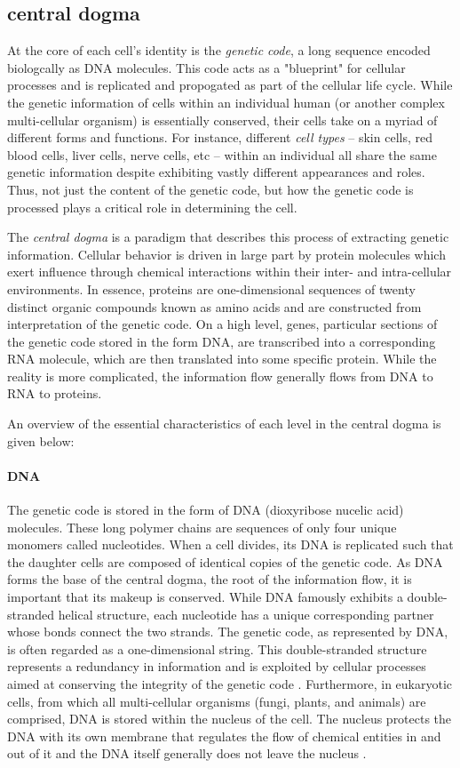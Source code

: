 \subsection{central dogma}
At the core of each cell's identity is the \emph{genetic code}, a long sequence encoded biologcally as DNA molecules.
This code acts as a "blueprint" for cellular processes and
is replicated and propogated as part of the cellular life cycle.
While the genetic information of cells within an individual human (or another complex multi-cellular organism) is essentially conserved, their cells take on a myriad of different forms and functions.
For instance, different \emph{cell types} -- skin cells, red blood cells, liver cells, nerve cells, etc -- within an individual all share the same genetic information despite exhibiting vastly different appearances and roles.
Thus, not just the content of the genetic code, but how the genetic code is processed plays a critical role in determining the cell.

The \emph{central dogma} is a paradigm that describes this process of extracting genetic information.
Cellular behavior is driven in large part by protein molecules which exert influence through chemical interactions within their inter- and intra-cellular environments.
In essence, proteins are one-dimensional sequences of twenty distinct organic compounds known as amino acids and are constructed from interpretation of the genetic code.
On a high level, genes, particular sections of the genetic code stored in the form DNA, are transcribed into a corresponding RNA molecule, which are then translated into some specific protein.
While the reality is more complicated, the information flow generally flows from DNA to RNA to proteins.

An overview of the essential characteristics of each level in the central dogma is given below:

\paragraph{DNA} The genetic code is stored in the form of DNA (dioxyribose nucelic acid) molecules.
These long polymer chains are sequences of only four unique monomers called nucleotides.
When a cell divides, its DNA is replicated such that the daughter cells are composed of identical copies of the genetic code.
As DNA forms the base of the central dogma, the root of the information flow, it is important that its makeup is conserved.
While DNA famously exhibits a double-stranded helical structure,
each nucleotide has a unique corresponding partner whose bonds connect the two strands.
The genetic code, as represented by DNA, is often regarded as a one-dimensional string.
This double-stranded structure represents a redundancy in information and is exploited by cellular processes aimed at conserving the integrity of the genetic code \cite{need}.
Furthermore, in eukaryotic cells, from which all multi-cellular organisms (fungi, plants, and animals) are comprised, DNA is stored within the nucleus of the cell.
The nucleus protects the DNA with its own membrane that regulates the flow of chemical entities in and out of it and the DNA itself generally does not leave the nucleus \cite{need}.

